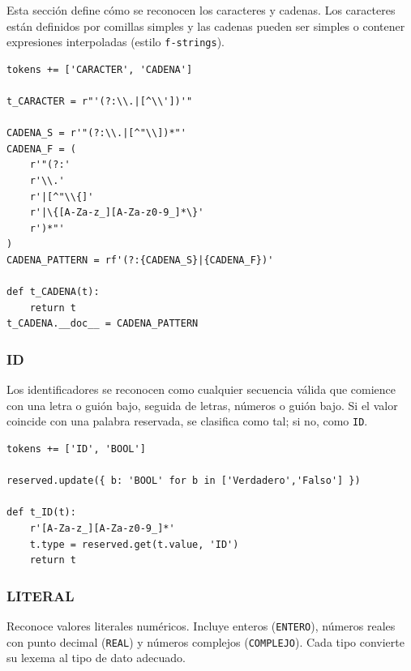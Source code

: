 \documentclass{article}
\begin{document}
Esta sección define cómo se reconocen los caracteres y cadenas. Los caracteres están definidos por comillas simples y las cadenas pueden ser simples o contener expresiones interpoladas (estilo \texttt{f-strings}).

\begin{lstlisting}[style=mypython]
tokens += ['CARACTER', 'CADENA']

t_CARACTER = r"'(?:\\.|[^\\'])'"

CADENA_S = r'"(?:\\.|[^"\\])*"'
CADENA_F = (
    r'"(?:'
    r'\\.'
    r'|[^"\\{]'
    r'|\{[A-Za-z_][A-Za-z0-9_]*\}'
    r')*"'
)
CADENA_PATTERN = rf'(?:{CADENA_S}|{CADENA_F})'

def t_CADENA(t):
    return t
t_CADENA.__doc__ = CADENA_PATTERN
\end{lstlisting}

\subsubsection{ID}

Los identificadores se reconocen como cualquier secuencia válida que comience con una letra o guión bajo, seguida de letras, números o guión bajo. Si el valor coincide con una palabra reservada, se clasifica como tal; si no, como \texttt{ID}.

\begin{lstlisting}[style=mypython]
tokens += ['ID', 'BOOL']

reserved.update({ b: 'BOOL' for b in ['Verdadero','Falso'] })

def t_ID(t):
    r'[A-Za-z_][A-Za-z0-9_]*'
    t.type = reserved.get(t.value, 'ID')
    return t
\end{lstlisting}

\subsubsection{LITERAL}

Reconoce valores literales numéricos. Incluye enteros (\texttt{ENTERO}), números reales con punto decimal (\texttt{REAL}) y números complejos (\texttt{COMPLEJO}). Cada tipo convierte su lexema al tipo de dato adecuado.
\end{document}
